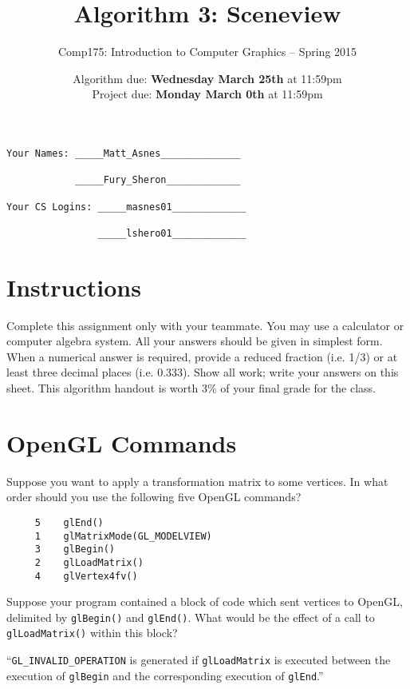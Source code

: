 \documentclass[10pt,twocolumn]{article}
\title{\Huge{\bf Algorithm 3: Sceneview}}
\author{Comp175: Introduction to Computer Graphics -- Spring 2015}
\date{Algorithm due:  {\bf Wednesday March 25th} at 11:59pm\\
Project due:  {\bf Monday March 0th} at 11:59pm}
\begin{document}
\maketitle

\begin{verbatim}
Your Names: _____Matt_Asnes______________

            _____Fury_Sheron_____________

Your CS Logins: _____masnes01_____________

                _____lshero01_____________
\end{verbatim}


\section{Instructions}
Complete this assignment only with your teammate. You may use a
calculator or computer algebra system. All your answers should be given in simplest form.
When a numerical answer is required, provide a reduced fraction (i.e. 1/3) or at least three
decimal places (i.e. 0.333). Show all work; write your answers on this sheet. This algorithm handout is worth 3\% of your final grade for the class.

\section{OpenGL Commands}
\begin{framed}
 Suppose you want to apply a transformation matrix to some vertices. In what order should you use the following five OpenGL commands?
\begin{verbatim}
     5    glEnd()
     1    glMatrixMode(GL_MODELVIEW)
     3    glBegin()
     2    glLoadMatrix()
     4    glVertex4fv()
\end{verbatim}
\end{framed}


\begin{framed}
 Suppose your program contained a block of code which sent vertices to OpenGL, delimited by {\tt glBegin()} and {\tt glEnd()}. What would be the effect of a call to {\tt glLoadMatrix()} within this block?

``\texttt{GL\_INVALID\_OPERATION} is generated if \texttt{glLoadMatrix} is executed between the execution of \texttt{glBegin} and the corresponding execution of \texttt{glEnd}.''

\end{framed}
\end{document}
